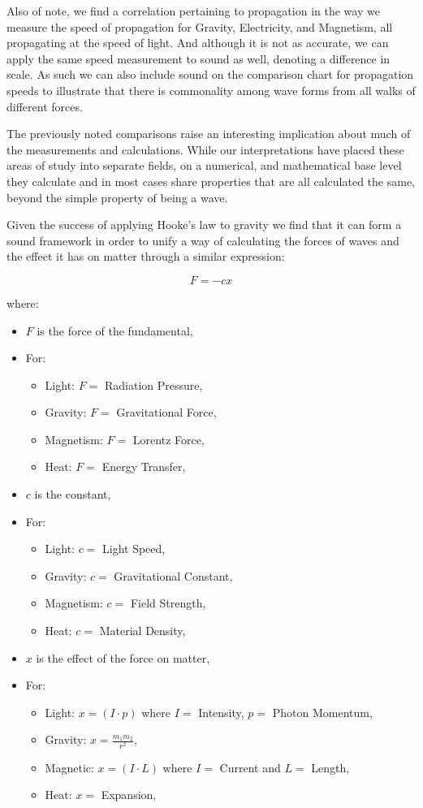 \documentclass[12pt]{article}
\begin{document}
Also of note, we find a correlation pertaining to propagation in the way we measure the speed of propagation for Gravity, Electricity, and Magnetism, all propagating at the speed of light. And although it is not as accurate, we can apply the same speed measurement to sound as well, denoting a difference in scale. As such we can also include sound on the comparison chart for propagation speeds to illustrate that there is commonality among wave forms from all walks of different forces.

The previously noted comparisons raise an interesting implication about much of the measurements and calculations. While our interpretations have placed these areas of study into separate fields, on a numerical, and mathematical base level they calculate and in most cases share properties that are all calculated the same, beyond the simple property of being a wave.

Given the success of applying Hooke’s law to gravity we find that it can form a sound framework in order to unify a way of calculating the forces of waves and the effect it has on matter through a similar expression:

\[
F = - c x
\]

where:

\begin{itemize}
    \item $F$ is the force of the fundamental,
    \item For:
    \begin{itemize}
        \item Light: $F = $ Radiation Pressure,
        \item Gravity: $F = $ Gravitational Force,
        \item Magnetism: $F = $ Lorentz Force,
        \item Heat: $F = $ Energy Transfer,
    \end{itemize}
    \item $c$ is the constant,
    \item For:
    \begin{itemize}
        \item Light: $c = $ Light Speed,
        \item Gravity: $c = $ Gravitational Constant,
        \item Magnetism: $c = $ Field Strength,
        \item Heat: $c = $ Material Density,
    \end{itemize}
    \item $x$ is the effect of the force on matter,
    \item For:
    \begin{itemize}
        \item Light: $x = (I \cdot p)$ where $I=$ Intensity, $p=$ Photon Momentum,
        \item Gravity: $x = \frac{m_1 m_2}{r^2}$,
        \item Magnetic: $x = (I \cdot L)$ where $I=$ Current and $L=$ Length,
        \item Heat: $x = $ Expansion,
    \end{itemize}
\end{itemize}
\end{document}
